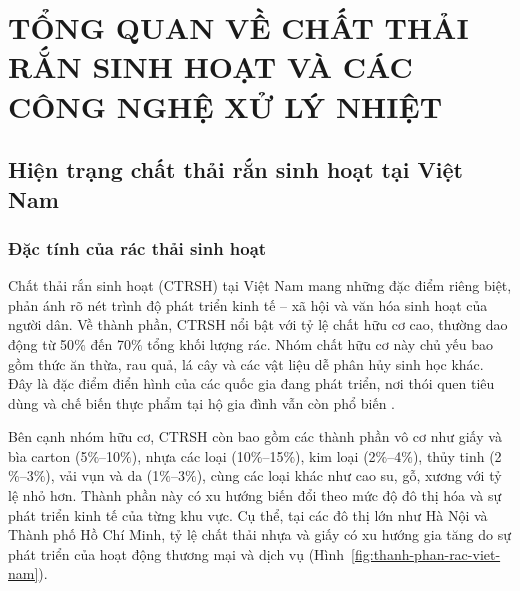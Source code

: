 \documentclass[../main.tex]{subfiles}
\begin{document}

\chapter{TỔNG QUAN VỀ CHẤT THẢI RẮN SINH HOẠT VÀ CÁC CÔNG NGHỆ XỬ LÝ NHIỆT}
\label{chuong1}

\section{Hiện trạng chất thải rắn sinh hoạt tại Việt Nam}

\subsection{Đặc tính của rác thải sinh hoạt}

Chất thải rắn sinh hoạt (CTRSH) tại Việt Nam mang những đặc điểm riêng biệt, phản ánh rõ nét trình độ phát triển kinh tế -- xã hội và văn hóa sinh hoạt của người dân. Về thành phần, CTRSH nổi bật với tỷ lệ chất hữu cơ cao, thường dao động từ 50$\%$ đến 70$\%$ tổng khối lượng rác. Nhóm chất hữu cơ này chủ yếu bao gồm thức ăn thừa, rau quả, lá cây và các vật liệu dễ phân hủy sinh học khác. Đây là đặc điểm điển hình của các quốc gia đang phát triển, nơi thói quen tiêu dùng và chế biến thực phẩm tại hộ gia đình vẫn còn phổ biến \cite{Thao2005}.

Bên cạnh nhóm hữu cơ, CTRSH còn bao gồm các thành phần vô cơ như giấy và bìa carton (5$\%$--10$\%$), nhựa các loại (10$\%$--15$\%$), kim loại (2$\%$--4$\%$), thủy tinh (2$\%$--3$\%$), vải vụn và da (1$\%$--3$\%$), cùng các loại khác như cao su, gỗ, xương với tỷ lệ nhỏ hơn. Thành phần này có xu hướng biến đổi theo mức độ đô thị hóa và sự phát triển kinh tế của từng khu vực. Cụ thể, tại các đô thị lớn như Hà Nội và Thành phố Hồ Chí Minh, tỷ lệ chất thải nhựa và giấy có xu hướng gia tăng do sự phát triển của hoạt động thương mại và dịch vụ (Hình~\ref{fig:thanh-phan-rac-viet-nam}).
\end{document}
